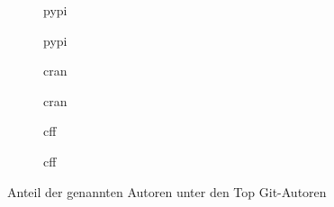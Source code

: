 \begin{figure}[H]
    \begin{subfigure}{.5\textwidth}
        \centering
        
        \caption{\gls{pypi}}
        \label{fig:common_authors_2_pypi}
    \end{subfigure}%
    \begin{subfigure}{.5\textwidth}
        \centering
        
        \caption{\gls{pypi}}
        \label{fig:common_authors_2_by_lines_pypi}
    \end{subfigure}
    \begin{subfigure}{.5\textwidth}
        \centering
        
        \caption{\gls{cran}}
        \label{fig:common_authors_2_cran}
    \end{subfigure}%
    \begin{subfigure}{.5\textwidth}
        \centering
        
        \caption{\gls{cran}}
        \label{fig:common_authors_2_by_lines_cran}
    \end{subfigure}
    \begin{subfigure}{.5\textwidth}
        \centering
        
        \caption{\gls{cff}}
        \label{fig:common_authors_2_cff}
    \end{subfigure}%
    \begin{subfigure}{.5\textwidth}
        \centering
        
        \caption{\gls{cff}}
        \label{fig:common_authors_2_by_lines_cff}
    \end{subfigure}
    \caption{Anteil der genannten Autoren unter den Top Git-Autoren}
    \label{fig:common_authors_2_anhang}
\end{figure}


